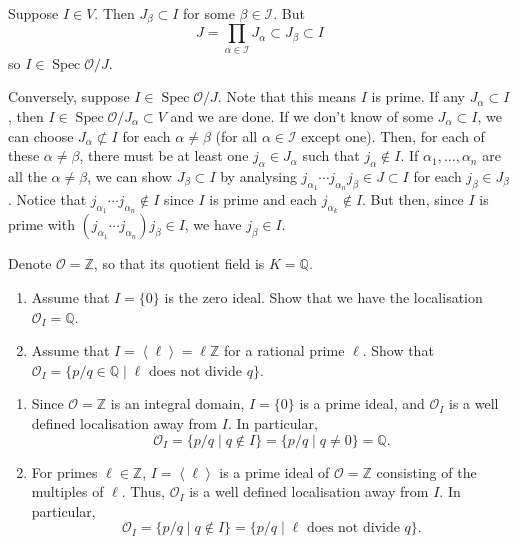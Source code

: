 \documentclass[12 pt, letterpaper]{hmcpset}
\begin{document}
\begin{solution}
\begin{enumerate}
			Suppose $I \in V$. Then $J_{\beta} \subset I$ for some $\beta \in \mathcal{I}$. But
			\[
				J = \prod_{\alpha \in \mathcal{I}} J_{\alpha} \subset J_{\beta} \subset I
			\]
			so $I \in \operatorname{Spec} \mathcal{O} / J$.

			Conversely, suppose $I \in \operatorname{Spec} \mathcal{O} / J$. Note that this means $I$ is prime. If any $J_{\alpha} \subset I$, then $I \in \operatorname{Spec} \mathcal{O} / J_{\alpha} \subset V$ and we are done. If we don't know of some $J_{\alpha} \subset I$, we can choose $J_{\alpha} \not \subset I$ for each $\alpha \neq \beta$ (for all $\alpha \in \mathcal{I}$ except one). Then, for each of these $\alpha \neq \beta$, there must be at least one $j_{\alpha} \in J_{\alpha}$ such that $j_{\alpha} \notin I$. If $\alpha_{1}, \dots, \alpha_{n}$ are all the $\alpha \neq \beta$, we can show $J_{\beta} \subset I$ by analysing $j_{\alpha_{1}} \dotsm j_{\alpha_{n}} j_{\beta} \in J \subset I$ for each $j_{\beta} \in J_{\beta}$. Notice that $j_{\alpha_{1}} \dotsm j_{\alpha_{n}} \notin I$ since $I$ is prime and each $j_{\alpha_{k}} \notin I$. But then, since  $I$ is prime with $(j_{\alpha_{1}} \dotsm j_{\alpha_{n}}) j_{\beta} \in I$, we have $j_{\beta} \in I$.
	\end{enumerate}
\end{solution}

\pagebreak

\begin{problem}[Problem 2.]
	Denote $\mathcal{O} = \mathbb{Z}$, so that its quotient field is $K = \mathbb{Q}$.
	\begin{enumerate}
		\item Assume that $I = \{ 0 \}$ is the zero ideal. Show that we have the localisation $\mathcal{O}_{I} = \mathbb{Q}$.
		\item Assume that $I = \left < \ell \right > = \ell \mathbb{Z}$ for a rational prime $\ell$. Show that $\mathcal{O}_{I} = \{ p / q \in \mathbb{Q} \mid \ell \text{ does not divide } q \}$.
	\end{enumerate}
\end{problem}

\begin{solution}
	\begin{enumerate}
		\item Since $\mathcal{O} = \mathbb{Z}$ is an integral domain, $I = \{ 0 \}$ is a prime ideal, and $\mathcal{O}_{I}$ is a well defined localisation away from $I$. In particular,
			\[
				\mathcal{O}_{I} = \{ p / q \mid q \notin I \} = \{ p / q \mid q \neq 0 \} = \mathbb{Q}.
			\]
		\item For primes $\ell \in \mathbb{Z}$, $I = \left < \ell \right >$ is a prime ideal of $\mathcal{O} = \mathbb{Z}$ consisting of the multiples of $\ell$. Thus, $\mathcal{O}_{I}$ is a well defined localisation away from $I$. In particular,
			\[
				\mathcal{O}_{I} = \{ p / q \mid q \notin I \} = \{ p / q \mid \ell \text{ does not divide } q \}.
			\]
	\end{enumerate}
\end{solution}
\end{document}
